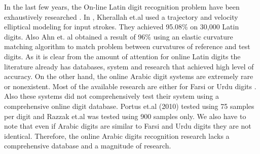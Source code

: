 \documentclass[times, 10pt,twocolumn]{article}
\begin{document}
In the last few years, the On-line Latin digit recognition problem have been exhaustively researched \cite{UniPen,Kherallah2008,ann2009,Prevost20051840}. In  \cite{Kherallah2008}, Kherallah et.al used a  trajectory and velocity elliptical modeling for input strokes. They achieved 95.08\% on 30,000 Latin digits. Also Ahn et. al \cite{ann2009} obtained a result of 96\% using an elastic curvature matching algorithm to match problem between curvatures of reference and test digits.  As it is clear from the amount of attention for online Latin digits the literature already has databases, system and research that achieved high level of accuracy. On the other hand, the online Arabic digit systems are extremely rare or nonexistent. Most of the available research are either for Farsi or Urdu digits \cite{razzak2009,Potrus2010}.  Also these systems did not comprehensively test their system using a comprehensive online digit database.  Portus et.al (2010)  \cite{Potrus2010} tested using 75 samples per digit and  Razzak et.al \cite{razzak2009}  was tested using 900 samples only.  We also have to note that even if Arabic digits are similar to Farsi and Urdu digits they are not identical. Therefore, the online Arabic digits recognition research lacks a comprehensive database and a magnitude of research.
\end{document}

